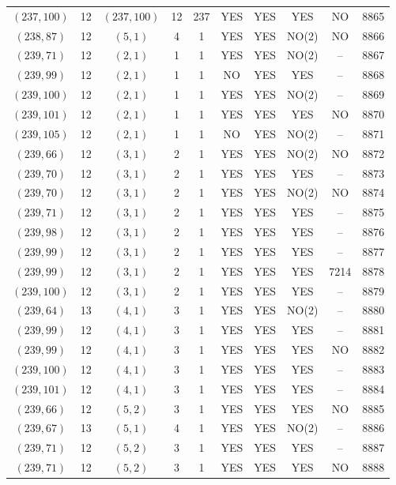 \begin{longtable}{|c|c|c|c|c|c|c|c|c|c|}
$(237, 100)$ & 12 & $(237, 100)$ & 12 & 237 & YES & YES & YES & NO & 8865\\
$(238, 87)$ & 12 & $(5, 1)$ & 4 & 1 & YES & YES & NO(2) & NO & 8866\\
$(239, 71)$ & 12 & $(2, 1)$ & 1 & 1 & YES & YES & NO(2) & -- & 8867\\
$(239, 99)$ & 12 & $(2, 1)$ & 1 & 1 & NO & YES & YES & -- & 8868\\
$(239, 100)$ & 12 & $(2, 1)$ & 1 & 1 & YES & YES & NO(2) & -- & 8869\\
$(239, 101)$ & 12 & $(2, 1)$ & 1 & 1 & YES & YES & YES & NO & 8870\\
$(239, 105)$ & 12 & $(2, 1)$ & 1 & 1 & NO & YES & NO(2) & -- & 8871\\
$(239, 66)$ & 12 & $(3, 1)$ & 2 & 1 & YES & YES & NO(2) & NO & 8872\\
$(239, 70)$ & 12 & $(3, 1)$ & 2 & 1 & YES & YES & YES & -- & 8873\\
$(239, 70)$ & 12 & $(3, 1)$ & 2 & 1 & YES & YES & NO(2) & NO & 8874\\
$(239, 71)$ & 12 & $(3, 1)$ & 2 & 1 & YES & YES & YES & -- & 8875\\
$(239, 98)$ & 12 & $(3, 1)$ & 2 & 1 & YES & YES & YES & -- & 8876\\
$(239, 99)$ & 12 & $(3, 1)$ & 2 & 1 & YES & YES & YES & -- & 8877\\
$(239, 99)$ & 12 & $(3, 1)$ & 2 & 1 & YES & YES & YES & 7214 & 8878\\
$(239, 100)$ & 12 & $(3, 1)$ & 2 & 1 & YES & YES & YES & -- & 8879\\
$(239, 64)$ & 13 & $(4, 1)$ & 3 & 1 & YES & YES & NO(2) & -- & 8880\\
$(239, 99)$ & 12 & $(4, 1)$ & 3 & 1 & YES & YES & YES & -- & 8881\\
$(239, 99)$ & 12 & $(4, 1)$ & 3 & 1 & YES & YES & YES & NO & 8882\\
$(239, 100)$ & 12 & $(4, 1)$ & 3 & 1 & YES & YES & YES & -- & 8883\\
$(239, 101)$ & 12 & $(4, 1)$ & 3 & 1 & YES & YES & YES & -- & 8884\\
$(239, 66)$ & 12 & $(5, 2)$ & 3 & 1 & YES & YES & YES & NO & 8885\\
$(239, 67)$ & 13 & $(5, 1)$ & 4 & 1 & YES & YES & NO(2) & -- & 8886\\
$(239, 71)$ & 12 & $(5, 2)$ & 3 & 1 & YES & YES & YES & -- & 8887\\
$(239, 71)$ & 12 & $(5, 2)$ & 3 & 1 & YES & YES & YES & NO & 8888\\

\end{longtable}
